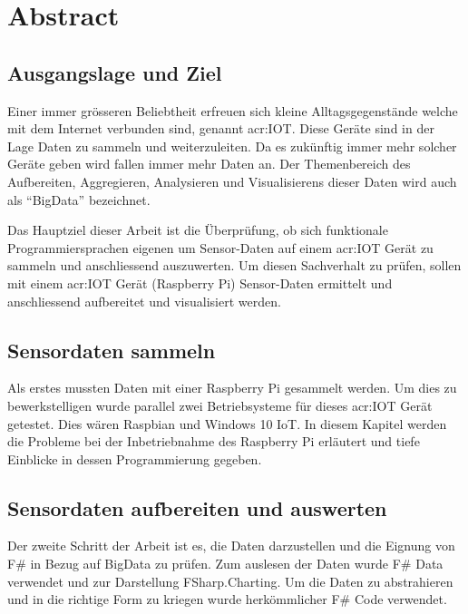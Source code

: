 
\section*{Abstract}

\subsection*{Ausgangslage und Ziel}
Einer immer grösseren Beliebtheit erfreuen sich kleine Alltagsgegenstände welche mit dem Internet verbunden sind, genannt \gls{acr:IOT}. Diese Geräte sind in der Lage Daten zu sammeln und weiterzuleiten. Da es zukünftig immer mehr solcher Geräte geben wird fallen immer mehr Daten an. Der Themenbereich des Aufbereiten, Aggregieren, Analysieren und Visualisierens dieser Daten wird auch als "`BigData"' bezeichnet.

Das Hauptziel dieser Arbeit ist die Überprüfung, ob sich funktionale Programmiersprachen eigenen um Sensor-Daten auf einem \gls{acr:IOT} Gerät zu sammeln und anschliessend auszuwerten. Um diesen Sachverhalt zu prüfen, sollen mit einem \gls{acr:IOT} Gerät (Raspberry Pi) Sensor-Daten ermittelt und anschliessend aufbereitet und visualisiert werden.

\subsection*{Sensordaten sammeln}
Als erstes mussten Daten mit einer Raspberry Pi gesammelt werden. Um dies zu bewerkstelligen wurde parallel zwei Betriebsysteme für dieses \gls{acr:IOT} Gerät getestet. Dies wären Raspbian und Windows 10 IoT. In diesem Kapitel werden die Probleme bei der Inbetriebnahme des Raspberry Pi erläutert und tiefe Einblicke in dessen Programmierung gegeben.

\subsection*{Sensordaten aufbereiten und auswerten}
Der zweite Schritt der Arbeit ist es, die Daten darzustellen und die Eignung von F\# in Bezug auf BigData zu prüfen. Zum auslesen der Daten wurde F\# Data verwendet und zur Darstellung FSharp.Charting. Um die Daten zu abstrahieren und in die richtige Form zu kriegen wurde herkömmlicher F\# Code verwendet.

